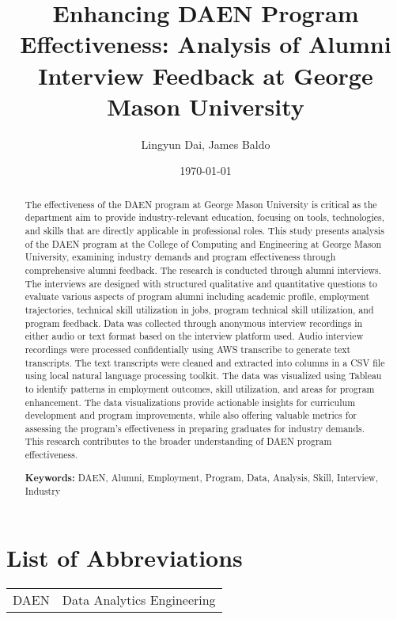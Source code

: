 \documentclass[12pt,a4paper]{article}
\title{\textbf{Enhancing DAEN Program Effectiveness: Analysis of Alumni Interview Feedback at George Mason University}}
\author{Lingyun Dai, James Baldo}
\date{\today}
\begin{document}
\maketitle

\begin{abstract}
The effectiveness of the DAEN program at George 
Mason University is critical as the department aim to provide industry-relevant education, focusing on tools, technologies, and skills that are directly applicable in professional roles. This study presents analysis of the DAEN program at the College of Computing and Engineering at George Mason University, examining industry demands and program effectiveness through comprehensive alumni feedback. The research is conducted through alumni interviews. The interviews are designed with structured qualitative and quantitative questions to evaluate various aspects of program alumni including academic profile, employment trajectories, technical skill utilization in jobs, program technical skill utilization, and program feedback. Data was collected through anonymous interview recordings in either audio or text format based on the interview platform used. Audio interview recordings were processed confidentially using AWS transcribe to generate text transcripts. The text transcripts were cleaned and extracted into columns in a CSV file using local natural language processing toolkit. The data was visualized using Tableau to identify patterns in employment outcomes, 
skill utilization, and areas for program enhancement. The data visualizations provide actionable insights for curriculum development 
and program improvements, while also offering valuable metrics for 
assessing the program's effectiveness in preparing graduates for 
industry demands. This research contributes to the broader 
understanding of DAEN program effectiveness.

\textbf{Keywords:} DAEN, Alumni, Employment, Program, Data,
 Analysis, Skill, Interview, Industry
\end{abstract}

\newpage
\tableofcontents
\newpage

\section*{List of Abbreviations}
\begin{tabular}{ll}
DAEN & Data Analytics Engineering\\
\end{tabular}
\newpage
\end{document}

